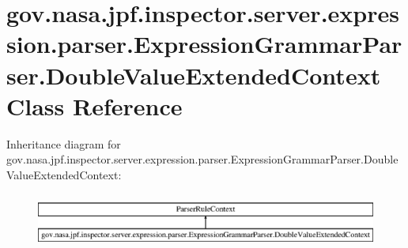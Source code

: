 \hypertarget{classgov_1_1nasa_1_1jpf_1_1inspector_1_1server_1_1expression_1_1parser_1_1_expression_grammar_paf529e59fbe08e921d008fd67634bb19c}{}\section{gov.\+nasa.\+jpf.\+inspector.\+server.\+expression.\+parser.\+Expression\+Grammar\+Parser.\+Double\+Value\+Extended\+Context Class Reference}
\label{classgov_1_1nasa_1_1jpf_1_1inspector_1_1server_1_1expression_1_1parser_1_1_expression_grammar_paf529e59fbe08e921d008fd67634bb19c}
Inheritance diagram for gov.\+nasa.\+jpf.\+inspector.\+server.\+expression.\+parser.\+Expression\+Grammar\+Parser.\+Double\+Value\+Extended\+Context\+:\begin{figure}[H]
\begin{center}
\leavevmode
\includegraphics[height=1.809370cm]{classgov_1_1nasa_1_1jpf_1_1inspector_1_1server_1_1expression_1_1parser_1_1_expression_grammar_paf529e59fbe08e921d008fd67634bb19c}
\end{center}
\end{figure}
